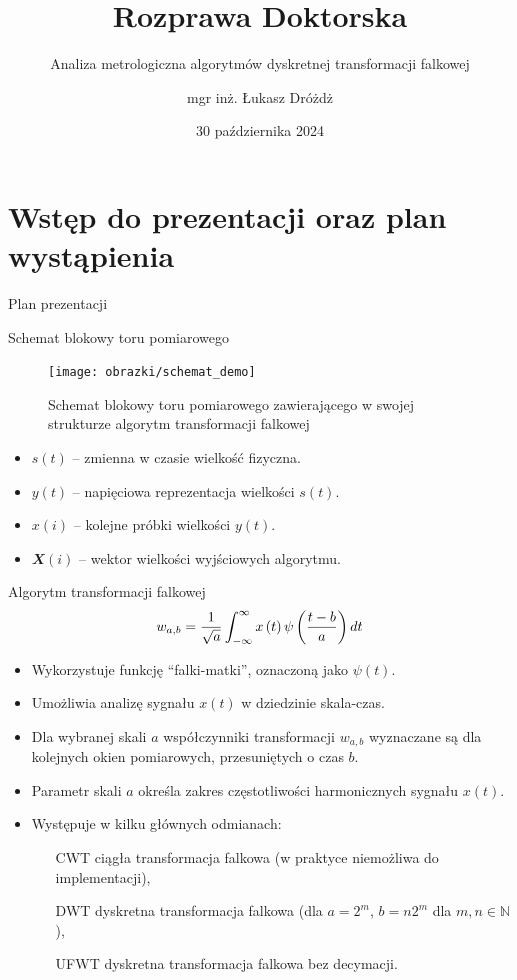 \documentclass[12pt, polish, aspectratio = 169]{slides}
\title{Rozprawa Doktorska}
\author{mgr inż. Łukasz Dróżdż}
\subtitle{Analiza metrologiczna algorytmów dyskretnej transformacji falkowej}
\institute{Politechnika Śląska, Wydział Elektryczny \\ Katedra Metrologii, Elektroniki i Automatyki}
\date{30 października 2024}
\begin{document}
\section*{Wstęp do prezentacji oraz plan wystąpienia}

\begin{frame}[plain]
\titlepage
\end{frame}

\begin{frame}{Plan prezentacji}
\tableofcontents
\end{frame}


\begin{frame}{Schemat blokowy toru pomiarowego}
\begin{figure}
\texttt{[image: obrazki/schemat\_demo]}
\caption{Schemat blokowy toru pomiarowego zawierającego w swojej strukturze algorytm transformacji falkowej}
\end{figure}
\begin{itemize}
\item $s(t)$ -- zmienna w czasie wielkość fizyczna.
\item $y(t)$ -- napięciowa reprezentacja wielkości $s(t)$.
\item $x(i)$ -- kolejne próbki wielkości $y(t)$.
\item $\mathbfit{X}(i)$ -- wektor wielkości wyjściowych algorytmu.
\end{itemize}
\end{frame}

\begin{frame}{Algorytm transformacji falkowej}
\begin{equation}
w_{a,b} = \frac{1}{\sqrt{a}} \int _{-\infty} ^{\infty} x \left(t\right) \psi \left(\frac{t-b}{a}\right) dt \label{eq:cwt}
\end{equation}
\begin{itemize}
\item Wykorzystuje funkcję \enquote{falki-matki}, oznaczoną jako $\psi(t)$.
\item Umożliwia analizę sygnału $x(t)$ w dziedzinie skala-czas.
\item Dla wybranej skali $a$ współczynniki transformacji $w_{a,b}$ wyznaczane są dla kolejnych okien pomiarowych, przesuniętych o czas $b$.
\item Parametr skali $a$ określa zakres częstotliwości harmonicznych sygnału $x(t)$.
\item Występuje w kilku głównych odmianach:
	\begin{itemize}
	\item[CWT] ciągła transformacja falkowa (w praktyce niemożliwa do implementacji),
	\item[DWT] dyskretna transformacja falkowa (dla $a = 2^m$, $b = n2^m$ dla $m, n \in \mathbb{N}$),
	\item[UFWT] dyskretna transformacja falkowa bez decymacji.
	\end{itemize}
\end{itemize}
\end{frame}
\end{document}
